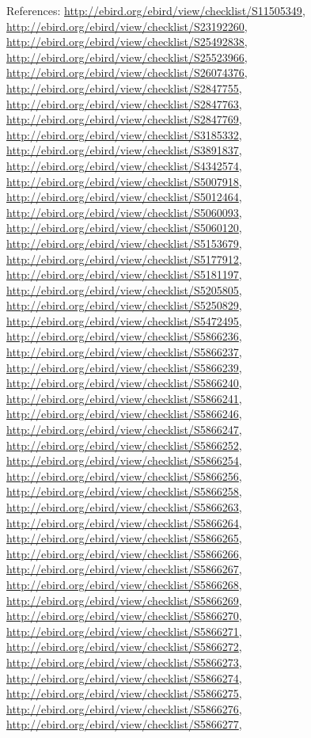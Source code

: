 \documentclass[9pt, article]{memoir}
\begin{document}
\begin{multicols}{2}
References: 
\url{http://ebird.org/ebird/view/checklist/S11505349}, 
\url{http://ebird.org/ebird/view/checklist/S23192260}, 
\url{http://ebird.org/ebird/view/checklist/S25492838}, 
\url{http://ebird.org/ebird/view/checklist/S25523966}, 
\url{http://ebird.org/ebird/view/checklist/S26074376}, 
\url{http://ebird.org/ebird/view/checklist/S2847755}, 
\url{http://ebird.org/ebird/view/checklist/S2847763}, 
\url{http://ebird.org/ebird/view/checklist/S2847769}, 
\url{http://ebird.org/ebird/view/checklist/S3185332}, 
\url{http://ebird.org/ebird/view/checklist/S3891837}, 
\url{http://ebird.org/ebird/view/checklist/S4342574}, 
\url{http://ebird.org/ebird/view/checklist/S5007918}, 
\url{http://ebird.org/ebird/view/checklist/S5012464}, 
\url{http://ebird.org/ebird/view/checklist/S5060093}, 
\url{http://ebird.org/ebird/view/checklist/S5060120}, 
\url{http://ebird.org/ebird/view/checklist/S5153679}, 
\url{http://ebird.org/ebird/view/checklist/S5177912}, 
\url{http://ebird.org/ebird/view/checklist/S5181197}, 
\url{http://ebird.org/ebird/view/checklist/S5205805}, 
\url{http://ebird.org/ebird/view/checklist/S5250829}, 
\url{http://ebird.org/ebird/view/checklist/S5472495}, 
\url{http://ebird.org/ebird/view/checklist/S5866236}, 
\url{http://ebird.org/ebird/view/checklist/S5866237}, 
\url{http://ebird.org/ebird/view/checklist/S5866239}, 
\url{http://ebird.org/ebird/view/checklist/S5866240}, 
\url{http://ebird.org/ebird/view/checklist/S5866241}, 
\url{http://ebird.org/ebird/view/checklist/S5866246}, 
\url{http://ebird.org/ebird/view/checklist/S5866247}, 
\url{http://ebird.org/ebird/view/checklist/S5866252}, 
\url{http://ebird.org/ebird/view/checklist/S5866254}, 
\url{http://ebird.org/ebird/view/checklist/S5866256}, 
\url{http://ebird.org/ebird/view/checklist/S5866258}, 
\url{http://ebird.org/ebird/view/checklist/S5866263}, 
\url{http://ebird.org/ebird/view/checklist/S5866264}, 
\url{http://ebird.org/ebird/view/checklist/S5866265}, 
\url{http://ebird.org/ebird/view/checklist/S5866266}, 
\url{http://ebird.org/ebird/view/checklist/S5866267}, 
\url{http://ebird.org/ebird/view/checklist/S5866268}, 
\url{http://ebird.org/ebird/view/checklist/S5866269}, 
\url{http://ebird.org/ebird/view/checklist/S5866270}, 
\url{http://ebird.org/ebird/view/checklist/S5866271}, 
\url{http://ebird.org/ebird/view/checklist/S5866272}, 
\url{http://ebird.org/ebird/view/checklist/S5866273}, 
\url{http://ebird.org/ebird/view/checklist/S5866274}, 
\url{http://ebird.org/ebird/view/checklist/S5866275}, 
\url{http://ebird.org/ebird/view/checklist/S5866276}, 
\url{http://ebird.org/ebird/view/checklist/S5866277}, 

\end{multicols}
\end{document}
